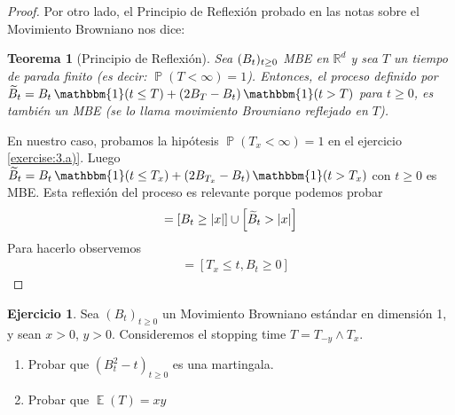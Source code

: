 \documentclass{article}
\DeclareMathOperator{\prob}{\mathbb{P}}
\DeclareMathOperator{\Expectation}{\mathbb{E}}
\DeclareMathOperator{\characteristic}{\mathbbm{1}}
\newcommand{\realnum}{\mathbb{R}}
\newtheorem{theorem}{Teorema}
\theoremstyle{definition}
\newtheorem{exercise}{Ejercicio}
\begin{document}
\begin{proof}
Por otro lado, el Principio de Reflexión probado en las notas sobre el Movimiento Browniano nos dice:
\begin{theorem}[Principio de Reflexión]
\label{theorem:ReflexionPrincipleForBrownianMotion}
Sea \((B_t)_{t \geq 0}\) MBE en \(\realnum^d\) y sea \(T\) un tiempo de parada finito (es decir: \(\prob(T < \infty) = 1\)).
Entonces, el proceso definido por \(\reflectedBrownian_t = \brownian_t \characteristic(t \leq T) + (2 \brownian_T - \brownian_t) \characteristic(t > T)\) para \(t \geq 0\), es también un MBE (se lo llama \emph{movimiento Browniano reflejado en \(T\)}).
\end{theorem}
En nuestro caso, probamos la hipótesis \(\prob(T_x < \infty) = 1\) en el ejercicio \ref{exercise:3.a)}.
Luego \(\reflectedBrownian_t = \brownian_t \characteristic(t \leq T_x) + (2 \brownian_{T_x} - \brownian_t) \characteristic(t > T_x)\) con \(t \geq 0\) es MBE.
Esta reflexión del proceso es relevante porque podemos probar 
\begin{align}
	[T_x \leq t] 
	= 
	[\brownian_t \geq \abs{x}] \cup \left[ \reflectedBrownian_t > \abs{x} \right]
\end{align}
Para hacerlo observemos
\begin{align}
	[T_x \leq t]
	&=
	[T_x \leq t, B_t \geq 0]
\end{align}

\end{proof}
\endgroup

\newpage
\begin{exercise}
Sea \((B_t)_{t \geq 0}\) un Movimiento Browniano estándar en dimensión 1, y sean \(x > 0\), \(y > 0\).
Consideremos el stopping time \(T = T_{- y} \wedge T_x\).
\begin{enumerate}[ref=\theexercise.\labelenumi]
	\item Probar que \((B_t^2 - t)_{t \geq 0}\) es una martingala.
	\item Probar que \(\Expectation(T) = xy\)
\end{enumerate}
\end{exercise}
\end{document}
